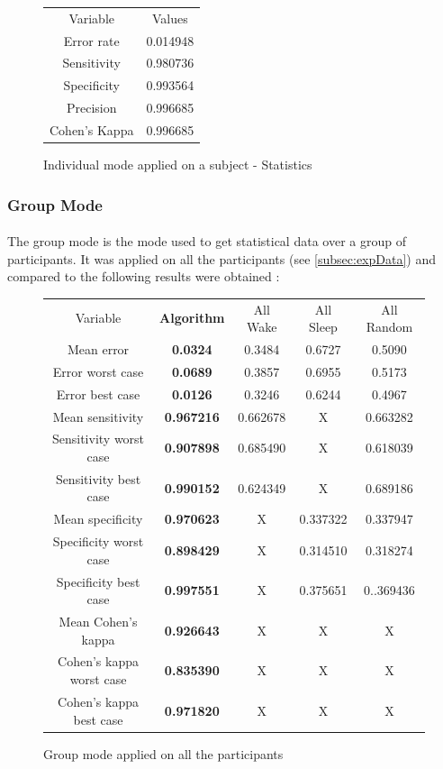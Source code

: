 \documentclass[a4paper,12pt]{article}
\newlength\savewidth
\newcommand\Ghline{%
	\noalign{\global\savewidth\arrayrulewidth\global\arrayrulewidth2pt}%
	\hline
	\noalign{\global\arrayrulewidth\savewidth}}
\begin{document}
\begin{figure}[H]
\centering
\begin{tabular}{|c|c|}
\hline
Variable & Values \\
\Ghline
Error rate & 0.014948\\
Sensitivity & 0.980736 \\
Specificity & 0.993564 \\
Precision & 0.996685 \\
Cohen's Kappa & 0.996685 \\
\hline
\end{tabular}
\caption{Individual mode applied on a subject - Statistics}
\label{comparisonStats}
\end{figure}

\subsubsection{Group Mode}

\paragraph{}
The group mode is the mode used to get statistical data over a group of participants. It was applied on all the participants (see \ref{subsec:expData}) and compared to the following results were obtained :

\begin{figure}[H]
\centering
\begin{tabular}{|c|c|c|c|c|}
\hline
Variable & \textbf{Algorithm} & All Wake & All Sleep & All Random \\
\Ghline
Mean error & \textbf{0.0324} & 0.3484 & 0.6727 & 0.5090 \\
Error worst case & \textbf{0.0689} & 0.3857 & 0.6955  & 0.5173 \\
Error best case & \textbf{0.0126} & 0.3246 & 0.6244  & 0.4967  \\
\hline
Mean sensitivity & \textbf{0.967216} & 0.662678 & X & 0.663282 \\
Sensitivity worst case & \textbf{0.907898} & 0.685490  & X & 0.618039\\
Sensitivity best case & \textbf{0.990152} & 0.624349 & X & 0.689186\\
\hline
Mean specificity & \textbf{0.970623} & X & 0.337322 & 0.337947\\
Specificity worst case & \textbf{0.898429} & X & 0.314510 & 0.318274 \\
Specificity best case & \textbf{0.997551} & X & 0.375651 & 0..369436\\
\hline
Mean Cohen's kappa & \textbf{0.926643} & X & X & X \\
Cohen's kappa worst case & \textbf{0.835390} & X & X & X \\
Cohen's kappa best case & \textbf{0.971820} & X & X & X \\
\hline
\end{tabular}
\caption{Group mode applied on all the participants}
\label{groupStats}
\end{figure}
\end{document}
